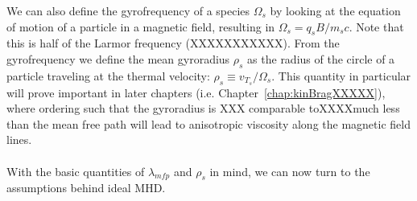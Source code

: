 We can also define the gyrofrequency of a species $\Omega_s$ by looking at the equation of motion of a particle in a magnetic field, resulting in $\Omega_s=q_sB/m_sc$. Note that this is half of the Larmor frequency (XXXXXXXXXXX). From the gyrofrequency we define the mean gyroradius $\rho_s$ as the radius of the circle of a particle traveling at the thermal velocity: $\rho_s\equiv v_{T_s}/\Omega_s$. This quantity in particular will prove important in later chapters (i.e. Chapter~\ref{chap:kinBragXXXXX}), where ordering such that the gyroradius is XXX comparable toXXXXmuch less than the mean free path will lead to anisotropic viscosity along the magnetic field lines.\\
\\
With the basic quantities of $\lambda_{mfp}$ and $\rho_s$ in mind, we can now turn to the assumptions behind ideal MHD.


